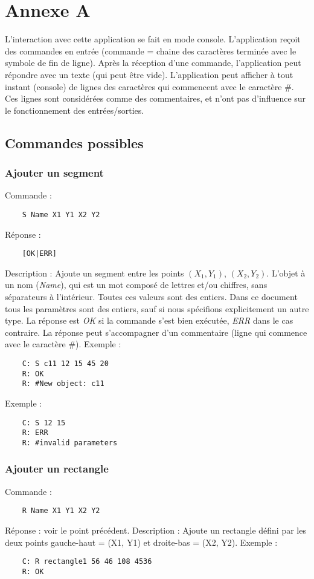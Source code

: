 \documentclass[oneside]{book}
\begin{document}
\chapter*{Annexe A}
L'interaction avec cette application se fait en mode console. L'application reçoit des commandes en entrée (commande = chaine des caractères terminée avec le symbole de fin de ligne). Après la réception d'une commande, l'application peut répondre avec un texte (qui peut être vide).
L'application peut afficher à tout instant (console) de lignes des caractères qui commencent avec le caractère \#. Ces lignes sont considérées comme des commentaires, et n'ont pas d'influence sur le fonctionnement des entrées/sorties.

\section*{Commandes possibles}
\subsection*{Ajouter un segment}
Commande : 
\begin{lstlisting}
	S Name X1 Y1 X2 Y2
\end{lstlisting}
Réponse : 
\begin{lstlisting}
	[OK|ERR]
\end{lstlisting}
Description : Ajoute un segment entre les points $(X_1,Y_1)$, $(X_2,Y_2)$. L'objet à un nom (\textit{Name}), qui est un mot composé de lettres et/ou chiffres, sans séparateurs à l'intérieur. Toutes ces valeurs sont des entiers. Dans ce document tous les paramètres sont des entiers, sauf si nous spécifions explicitement un autre type. La réponse est \textit{OK} si la commande s'est bien exécutée, \textit{ERR} dans le cas contraire. La réponse peut s'accompagner d'un commentaire (ligne qui commence avec le caractère \#). 
\newline
Exemple :
\begin{lstlisting}
	C: S c11 12 15 45 20
	R: OK
	R: #New object: c11 
\end{lstlisting}
Exemple :
\begin{lstlisting}
	C: S 12 15
	R: ERR
	R: #invalid parameters
\end{lstlisting}

\subsection*{Ajouter un rectangle}
Commande : 
\begin{lstlisting}
	R Name X1 Y1 X2 Y2
\end{lstlisting}
Réponse : voir le point précédent.\newline
Description : Ajoute un rectangle défini par les deux points gauche-haut = (X1, Y1) et droite-bas = (X2, Y2).\newline
Exemple :
\begin{lstlisting}
	C: R rectangle1 56 46 108 4536
	R: OK
\end{lstlisting}
\end{document}
